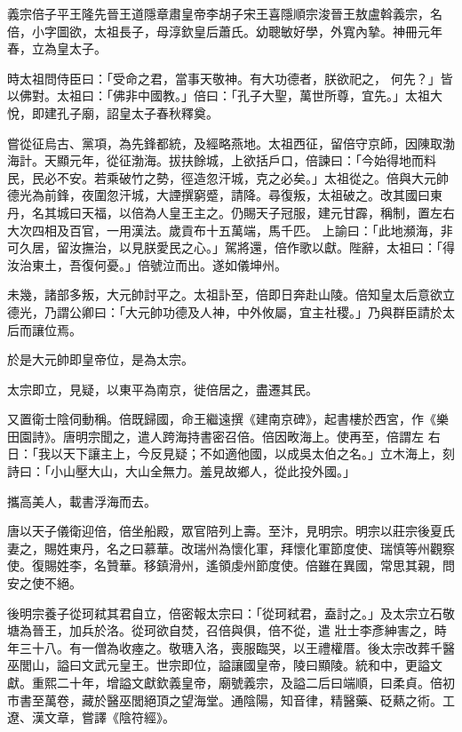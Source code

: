 
\begin{pinyinscope}

 義宗倍子平王隆先晉王道隱章肅皇帝李胡子宋王喜隱順宗浚晉王敖盧斡義宗，名倍，小字圖欲，太祖長子，母淳欽皇后蕭氏。幼聰敏好學，外寬內摯。神冊元年春，立為皇太子。



 時太祖問侍臣曰：「受命之君，當事天敬神。有大功德者，朕欲祀之，
 何先？」皆以佛對。太祖曰：「佛非中國教。」倍曰：「孔子大聖，萬世所尊，宜先。」太祖大悅，即建孔子廟，詔皇太子春秋釋奠。



 嘗從征烏古、黨項，為先鋒都統，及經略燕地。太祖西征，留倍守京師，因陳取渤海計。天顯元年，從征渤海。拔扶餘城，上欲括戶口，倍諫曰：「今始得地而料民，民必不安。若乘破竹之勢，徑造忽汗城，克之必矣。」太祖從之。倍與大元帥德光為前鋒，夜圍忽汗城，大諲撰窮蹙，請降。尋復叛，太祖破之。改其國曰東丹，名其城曰天福，以倍為人皇王主之。仍賜天子冠服，建元甘霹，稱制，置左右大次四相及百官，一用漢法。歲貢布十五萬端，馬千匹。
 上諭曰：「此地瀕海，非可久居，留汝撫治，以見朕愛民之心。」駕將還，倍作歌以獻。陛辭，太祖曰：「得汝治東土，吾復何憂。」倍號泣而出。遂如儀坤州。



 未幾，諸部多叛，大元帥討平之。太祖訃至，倍即日奔赴山陵。倍知皇太后意欲立德光，乃謂公卿曰：「大元帥功德及人神，中外攸屬，宜主社稷。」乃與群臣請於太后而讓位焉。



 於是大元帥即皇帝位，是為太宗。



 太宗即立，見疑，以東平為南京，徙倍居之，盡遷其民。



 又置衛士陰伺動稱。倍既歸國，命王繼遠撰《建南京碑》，起書樓於西宮，作《樂田園詩》。唐明宗聞之，遣人跨海持書密召倍。倍因畋海上。使再至，倍謂左
 右日：「我以天下讓主上，今反見疑；不如適他國，以成吳太伯之名。」立木海上，刻詩曰：「小山壓大山，大山全無力。羞見故鄉人，從此投外國。」



 攜高美人，載書浮海而去。



 唐以天子儀衛迎倍，倍坐船殿，眾官陪列上壽。至汴，見明宗。明宗以莊宗後夏氏妻之，賜姓東丹，名之曰慕華。改瑞州為懷化軍，拜懷化軍節度使、瑞慎等州觀察使。復賜姓李，名贊華。移鎮滑州，遙領虔州節度使。倍雖在異國，常思其親，問安之使不絕。



 後明宗養子從珂弒其君自立，倍密報太宗曰：「從珂弒君，盍討之。」及太宗立石敬塘為晉王，加兵於洛。從珂欲自焚，召倍與俱，倍不從，遣
 壯士李彥紳害之，時年三十八。有一僧為收瘞之。敬瑭入洛，喪服臨哭，以王禮權厝。後太宗改葬千醫巫閭山，謚曰文武元皇王。世宗即位，謚讓國皇帝，陵曰顯陵。統和中，更謚文獻。重熙二十年，增謚文獻欽義皇帝，廟號義宗，及謚二后曰端順，曰柔貞。倍初市書至萬卷，藏於醫巫閭絕頂之望海堂。通陰陽，知音律，精醫藥、砭爇之術。工遼、漢文章，嘗譯《陰符經》。




\end{pinyinscope}
